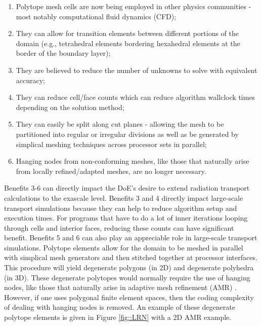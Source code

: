 \documentclass[11pt]{article}
\begin{document}
\vspace{4mm}
\begin{enumerate}
	\item Polytope mesh cells are now being employed in other physics communities - most notably computational fluid dynamics (CFD)\cite{ref::star_CCM};
	\item They can allow for transition elements between different portions of the domain (e.g., tetrahedral elements bordering hexahedral elements at the border of the boundary layer);
	\item They are believed to reduce the number of unknowns to solve with equivalent accuracy;
	\item They can reduce cell/face counts which can reduce algorithm wallclock times depending on the solution method;
	\item They can easily be split along cut planes - allowing the mesh to be partitioned into regular or irregular divisions as well as be generated by simplical meshing techniques across processor sets in parallel;
	\item Hanging nodes from non-conforming meshes, like those that naturally arise from locally refined/adapted meshes, are no longer necessary. 
\end{enumerate}
\vspace{4mm}

Benefits 3-6 can directly impact the DoE's desire to extend radiation transport calculations to the exascale level. Benefits 3 and 4 directly impact large-scale transport simulations because they can help to reduce algorithm setup and execution times. For programs that have to do a lot of inner iterations looping through cells and interior faces, reducing these counts can have significant benefit. Benefits 5 and 6 can also play an appreciable role in large-scale transport simulations. Polytope elements allow for the domain to be meshed in parallel with simplical mesh generators \cite{shewchuk1996triangle,shewchuk2002delaunay,si2006quality,geuzaine2009gmsh} and then stitched together at processor interfaces. This procedure will yield degenerate polygons (in 2D) and degenerate polyhedra (in 3D). These degenerate polytopes would normally require the use of hanging nodes, like those that naturally arise in adaptive mesh refinement (AMR) \cite{plewa2005adaptive,berger1984adaptive,oden2001goal,vsolin2004goal}. However, if one uses polygonal finite element spaces, then the coding complexity of dealing with hanging nodes is removed. An example of these degenerate polytope elements is given in Figure \ref{fig::LRN} with a 2D AMR example.
\end{document}

